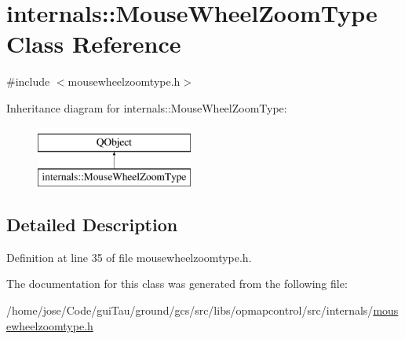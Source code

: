 \hypertarget{classinternals_1_1_mouse_wheel_zoom_type}{\section{internals\-:\-:Mouse\-Wheel\-Zoom\-Type Class Reference}
\label{classinternals_1_1_mouse_wheel_zoom_type}
}


{\ttfamily \#include $<$mousewheelzoomtype.\-h$>$}

Inheritance diagram for internals\-:\-:Mouse\-Wheel\-Zoom\-Type\-:\begin{figure}[H]
\begin{center}
\leavevmode
\includegraphics[height=2.000000cm]{classinternals_1_1_mouse_wheel_zoom_type}
\end{center}
\end{figure}


\subsection{Detailed Description}


Definition at line 35 of file mousewheelzoomtype.\-h.



The documentation for this class was generated from the following file\-:\begin{DoxyCompactItemize}
\item 
/home/jose/\-Code/gui\-Tau/ground/gcs/src/libs/opmapcontrol/src/internals/\hyperlink{mousewheelzoomtype_8h}{mousewheelzoomtype.\-h}\end{DoxyCompactItemize}
